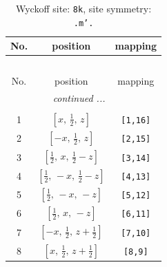 \documentclass[fleqn,8pt]{jsarticle}
\begin{document}
\begin{longtable}{ccc}
\caption{Wyckoff site: {\tt 8k}, site symmetry: {\tt .m'.}}
 \\
 \hline \hline
No. & position & mapping \\ \hline \endfirsthead

\multicolumn{2}{l}{\tablename\ \thetable{}} \\
 \hline \hline
No. & position & mapping \\ \hline \endhead

 \hline \hline
\multicolumn{2}{r}{\footnotesize\it continued ...} \\ \endfoot

 \hline \hline
\multicolumn{2}{r}{} \\ \endlastfoot

1 & $\left[ x,\, \frac{1}{2},\, z \right]$ & {\tt [1,16]} \\ \hline
2 & $\left[ - x,\, \frac{1}{2},\, z \right]$ & {\tt [2,15]} \\ \hline
3 & $\left[ \frac{1}{2},\, x,\, \frac{1}{2} - z \right]$ & {\tt [3,14]} \\ \hline
4 & $\left[ \frac{1}{2},\, - x,\, \frac{1}{2} - z \right]$ & {\tt [4,13]} \\ \hline
5 & $\left[ \frac{1}{2},\, - x,\, - z \right]$ & {\tt [5,12]} \\ \hline
6 & $\left[ \frac{1}{2},\, x,\, - z \right]$ & {\tt [6,11]} \\ \hline
7 & $\left[ - x,\, \frac{1}{2},\, z + \frac{1}{2} \right]$ & {\tt [7,10]} \\ \hline
8 & $\left[ x,\, \frac{1}{2},\, z + \frac{1}{2} \right]$ & {\tt [8,9]} \\
\end{longtable}
\renewcommand{\arraystretch}{1.2}
\end{document}
